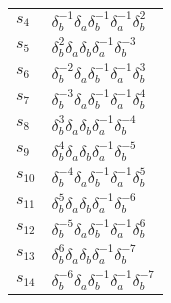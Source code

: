 \documentclass{article}
\begin{document}
\begin{center}
\begin{tabular}{ll}
$s_{4}$ & $\delta_b^{-1}\delta_a^{}\delta_b^{-1}\delta_a^{-1}\delta_b^{2}$ \\
$s_{5}$ & $\delta_b^{2}\delta_a^{}\delta_b^{}\delta_a^{-1}\delta_b^{-3}$ \\
$s_{6}$ & $\delta_b^{-2}\delta_a^{}\delta_b^{-1}\delta_a^{-1}\delta_b^{3}$ \\
$s_{7}$ & $\delta_b^{-3}\delta_a^{}\delta_b^{-1}\delta_a^{-1}\delta_b^{4}$ \\
$s_{8}$ & $\delta_b^{3}\delta_a^{}\delta_b^{}\delta_a^{-1}\delta_b^{-4}$ \\
$s_{9}$ & $\delta_b^{4}\delta_a^{}\delta_b^{}\delta_a^{-1}\delta_b^{-5}$ \\
$s_{10}$ & $\delta_b^{-4}\delta_a^{}\delta_b^{-1}\delta_a^{-1}\delta_b^{5}$ \\
$s_{11}$ & $\delta_b^{5}\delta_a^{}\delta_b^{}\delta_a^{-1}\delta_b^{-6}$ \\
$s_{12}$ & $\delta_b^{-5}\delta_a^{}\delta_b^{-1}\delta_a^{-1}\delta_b^{6}$ \\
$s_{13}$ & $\delta_b^{6}\delta_a^{}\delta_b^{}\delta_a^{-1}\delta_b^{-7}$ \\
$s_{14}$ & $\delta_b^{-6}\delta_a^{}\delta_b^{-1}\delta_a^{-1}\delta_b^{-7}$ \\
\bottomrule
\end{tabular}
\end{center}

\thispagestyle{empty}
\end{document}
